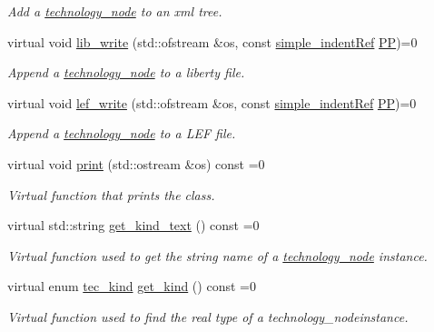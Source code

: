 \begin{DoxyCompactItemize}
\begin{DoxyCompactList}\small\item\em Add a \hyperlink{structtechnology__node}{technology\+\_\+node} to an xml tree. \end{DoxyCompactList}\item 
virtual void \hyperlink{structtechnology__node_a7e56b3bd8c693bb664fae9e5538b2526}{lib\+\_\+write} (std\+::ofstream \&os, const \hyperlink{simple__indent_8hpp_ad85cff64e49d5dbf5cefe96f411c720e}{simple\+\_\+indent\+Ref} \hyperlink{structtechnology__node_ae6edfff0ccd2700b5de9fb538536977a}{PP})=0
\begin{DoxyCompactList}\small\item\em Append a \hyperlink{structtechnology__node}{technology\+\_\+node} to a liberty file. \end{DoxyCompactList}\item 
virtual void \hyperlink{structtechnology__node_a2a92a701dec7c32a6bee6f66576f1fc6}{lef\+\_\+write} (std\+::ofstream \&os, const \hyperlink{simple__indent_8hpp_ad85cff64e49d5dbf5cefe96f411c720e}{simple\+\_\+indent\+Ref} \hyperlink{structtechnology__node_ae6edfff0ccd2700b5de9fb538536977a}{PP})=0
\begin{DoxyCompactList}\small\item\em Append a \hyperlink{structtechnology__node}{technology\+\_\+node} to a L\+EF file. \end{DoxyCompactList}\item 
virtual void \hyperlink{structtechnology__node_a44f347bae9b9b59726f323b5a6ad9ebf}{print} (std\+::ostream \&os) const =0
\begin{DoxyCompactList}\small\item\em Virtual function that prints the class. \end{DoxyCompactList}\item 
virtual std\+::string \hyperlink{structtechnology__node_a4b8785a8d6c2db19e1bec0d3eef5c8f2}{get\+\_\+kind\+\_\+text} () const =0
\begin{DoxyCompactList}\small\item\em Virtual function used to get the string name of a \hyperlink{structtechnology__node}{technology\+\_\+node} instance. \end{DoxyCompactList}\item 
virtual enum \hyperlink{technology__node_8hpp_ac8c5c7b9c4a4b68049cd228ba6042de2}{tec\+\_\+kind} \hyperlink{structtechnology__node_addc44daafd369586b8cee878d4df5e12}{get\+\_\+kind} () const =0
\begin{DoxyCompactList}\small\item\em Virtual function used to find the real type of a technology\+\_\+nodeinstance. \end{DoxyCompactList}\end{DoxyCompactItemize}
